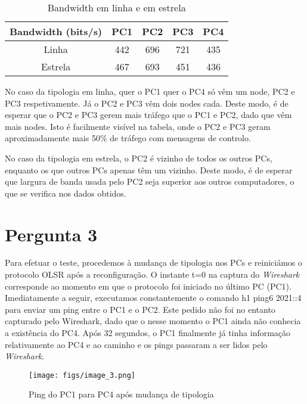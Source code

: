 \begin{table}
\begin{center}
    \Large{
    \begin{tabular}{ | c | c| c | c | c |} 
    \hline
    Bandwidth (bits/s) & PC1 & PC2 & PC3 & PC4 \\ 
    \hline
    Linha & 442 & 696 & 721 & 435\\ 
    \hline
    Estrela & 467 & 693 & 451 & 436\\
    \hline
    \end{tabular}
    }
\end{center}
\caption{Bandwidth em linha e em estrela}
\label{tab:1}
\end{table}

No caso da tipologia em linha, quer o PC1 quer o PC4 só vêm um node, PC2 e PC3 respetivamente. Já o PC2 e PC3 vêm dois nodes cada.
Deste modo, é de esperar que o PC2 e PC3 gerem mais tráfego que o PC1 e PC2, dado que vêm mais nodes. Isto é facilmente visível na tabela,
onde o PC2 e PC3 geram aproximadamente mais 50\% de tráfego com mensagens de controlo.

No caso da tipologia em estrela, o PC2 é vizinho de todos os outros PCs, enquanto os que outros PCs apenas têm um vizinho.
Deste modo, é de esperar que largura de banda usada pelo PC2 seja superior aos outros computadores, o que se verifica nos dados obtidos.


\section{Pergunta 3} \label{ex3}

Para efetuar o teste, procedemos à mudança de tipologia nos PCs e reiniciámos o protocolo OLSR após a reconfiguração.
O instante t=0 na captura do \textit{Wireshark} corresponde ao momento em que o protocolo foi iniciado no último PC (PC1).
Imediatamente a seguir, executamos constantemente o comando h1 ping6 2021::4 para enviar um ping entre o PC1 e o PC2.
Este pedido não foi no entanto capturado pelo Wireshark, dado que o nesse momento o PC1 ainda não conhecia a existência do PC4.
Após 32 segundos, o PC1 finalmente já tinha informação relativamente ao PC4 e ao caminho e os pings passaram a ser lidos pelo \textit{Wireshark}.

\begin{figure}[H]
    \centering
    \texttt{[image: figs/image\_3.png]}
    \caption{Ping do PC1 para PC4 após mudança de tipologia}
    \label{fig:3}
\end{figure}

